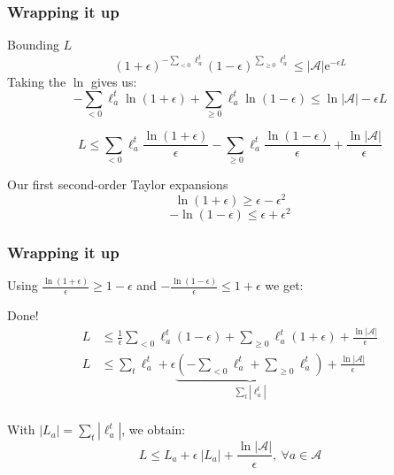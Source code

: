 \documentclass{beamer}
\begin{document}
\begin{frame}
    \frametitle{Wrapping it up}

    \begin{block}{Bounding $L$}
        \begin{equation*}
                    (1 + \epsilon)^{- \sum_{< 0} \ell_a^t}
                    (1 - \epsilon)^{\sum_{\geq 0} \ell_a^t}
                    \leq |\mathcal{A}| \mathrm{e}^{- \epsilon L}
            \end{equation*}
            Taking the $\ln$ gives us:
        \begin{equation*}
        - \sum_{<0} \ell_a^t \ln(1 + \epsilon)
        + \sum_{\geq 0} \ell_a^t \ln(1 - \epsilon)
        \leq \ln |\mathcal{A}| -\epsilon L
        \end{equation*}

        \begin{equation*}
        L \leq
        \sum_{< 0} \ell_a^t \frac{\ln(1 + \epsilon)}{\epsilon}
        - \sum_{\geq 0} \ell_a^t \frac{\ln(1 - \epsilon)}{\epsilon}
        +\frac{\ln |\mathcal{A}|}{\epsilon}
        \end{equation*}
    \end{block}

    \begin{block}{Our first second-order Taylor expansions}
        \begin{equation*}
            \ln(1 + \epsilon) \geq \epsilon - \epsilon^2
        \end{equation*}
        \begin{equation*}
        -\ln(1 - \epsilon) \leq \epsilon + \epsilon^2
        \end{equation*}
    \end{block}

\end{frame}

\begin{frame}
    \frametitle{Wrapping it up}

    Using
    $\frac{\ln(1 + \epsilon)}{\epsilon} \geq 1 - \epsilon$ and
    $-\frac{\ln(1 - \epsilon)}{\epsilon} \leq 1 + \epsilon$
    we get:
    
    \begin{block}{Done!}
    \begin{align*}
    L & \leq
        \frac{1}{\epsilon} \sum_{< 0} \ell_a^t (1 - \epsilon)
        + \sum_{\geq 0} \ell_a^t (1 + \epsilon)
    + \frac{\ln |\mathcal{A}|}{\epsilon} \\
    L & \leq
    \sum_t \ell_a^t
    + \epsilon 
    \underbrace{
    (- \sum_{< 0} \ell_a^t + \sum_{\geq 0} \ell_a^t)}_{\sum_{t} |\ell_a^t|}
    + \frac{\ln |\mathcal{A}|}{\epsilon} \\
    \end{align*}

    With $|L_a| = \sum_{t} |\ell_a^t|$, we obtain:
    \begin{equation*}
    L \leq L_a + \epsilon~|L_a|
    +\frac{\ln |\mathcal{A}|}{\epsilon},~ \forall a\in \mathcal{A}
    \end{equation*}
    \end{block}

\end{frame}
\end{document}
